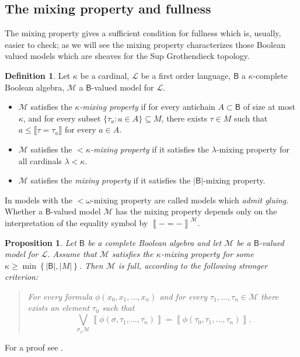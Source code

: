 \documentclass[11pt]{amsart}
\newcommand{\LL}{\mathcal{L}}
\theoremstyle{plain}
\newtheorem{proposition}[theorem]{Proposition}
\theoremstyle{definition}
\newtheorem{definition}[theorem]{Definition}
\theoremstyle{plain}
\theoremstyle{remark}
\newcommand{\M}{\mathcal{M}}
\newcommand{\bool}[1]{\mathsf{#1}}
\newcommand{\Qp}[1]{\left\llbracket #1 \right\rrbracket}
\newcommand{\bp}[1]{\left\lbrace #1 \right\rbrace}
\newcommand{\0}{\mathsf{0}}
\renewcommand{\1}{\mathsf{1}}
\renewcommand{\2}{\mathsf{2}}
\theoremstyle{definition}
\begin{document}
\subsection{The mixing property and fullness} 

The mixing property gives a sufficient condition for  fullness  which is, usually, easier to check; as we will see the mixing property characterizes those Boolean valued models which are sheaves for the Sup Grothendieck topology.
\begin{definition}\label{def:mixprop}
Let $\kappa$ be a cardinal,
$\LL$ be a first order language, $\bool{B}$ a 
$\kappa$-complete Boolean algebra,
$\M$ a $\bool{B}$-valued model for $\LL$.
\begin{itemize}
\item
$\M$ satisfies the \emph{$\kappa$-mixing property} if for every antichain $A\subset \bool{B}$
of size at most $\kappa$, and for every subset $\{\tau_a: a\in A\}\subseteq M$, there exists 
$\tau\in M$ such that $a\leq\llbracket\tau=\tau_a\rrbracket$ for every $a\in A$.
\item
$\M$ satisfies the \emph{$<\kappa$-mixing property}
if it satisfies the $\lambda$-mixing property for all
cardinals $\lambda<\kappa$.
\item
$\M$ satisfies the \emph{mixing property}
if it satisfies the $|\bool{B}|$-mixing property.
\end{itemize}
\end{definition}
In \cite{HODG} models with the $<\omega$-mixing property are called models which \emph{admit gluing}.
Whether a $\bool{B}$-valued model $\M$ has the mixing property depends only on the interpretation of the equality symbol by $\Qp{-=-}^\M$.
\begin{proposition}
\label{ful:mod}
Let $\bool{B}$ be a complete Boolean algebra and let $\M$ be a $\bool{B}$-valued model for $\LL$.  Assume that $\M$ satisfies the $\kappa$-mixing property for some $\kappa\geq\min\bp{|\bool{B}|, |M|}$. Then $\M$ is full, according to the following stronger criterion:
\begin{quote}
\emph{
For every formula $\phi(x_0, x_1, \dots, x_n)$ and for every $\tau_1, \dots, \tau_n\in\M$ there exists an element $\tau_0$ such that}
\[
\bigvee_{\sigma_\in\M}\Qp{\phi(\sigma, \tau_1, \dots, \tau_n)}=\Qp{\phi(\tau_0, \tau_1, \dots, \tau_n)}.
\]
\end{quote}
\end{proposition}
For a proof see \cite[Proposition 6.3.14, Remark 6.3.15]{viale-bookonforcing}.
\end{document}
